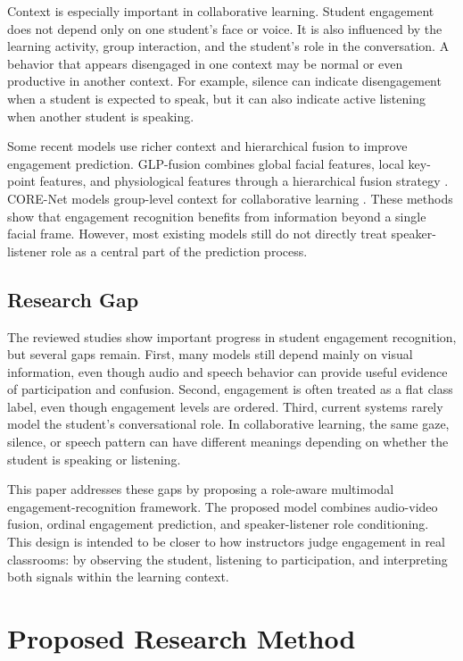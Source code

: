 \documentclass[journal]{IEEEtran}
\begin{document}
Context is especially important in collaborative learning. Student engagement does not depend only on one student's face or voice. It is also influenced by the learning activity, group interaction, and the student's role in the conversation. A behavior that appears disengaged in one context may be normal or even productive in another context. For example, silence can indicate disengagement when a student is expected to speak, but it can also indicate active listening when another student is speaking.

Some recent models use richer context and hierarchical fusion to improve engagement prediction. GLP-fusion combines global facial features, local key-point features, and physiological features through a hierarchical fusion strategy \cite{qin2026glpfusion}. CORE-Net models group-level context for collaborative learning \cite{tran2026ordinal}. These methods show that engagement recognition benefits from information beyond a single facial frame. However, most existing models still do not directly treat speaker-listener role as a central part of the prediction process.

\subsection{Research Gap}

The reviewed studies show important progress in student engagement recognition, but several gaps remain. First, many models still depend mainly on visual information, even though audio and speech behavior can provide useful evidence of participation and confusion. Second, engagement is often treated as a flat class label, even though engagement levels are ordered. Third, current systems rarely model the student's conversational role. In collaborative learning, the same gaze, silence, or speech pattern can have different meanings depending on whether the student is speaking or listening.

This paper addresses these gaps by proposing a role-aware multimodal engagement-recognition framework. The proposed model combines audio-video fusion, ordinal engagement prediction, and speaker-listener role conditioning. This design is intended to be closer to how instructors judge engagement in real classrooms: by observing the student, listening to participation, and interpreting both signals within the learning context.



\section{Proposed Research Method}
\end{document}

